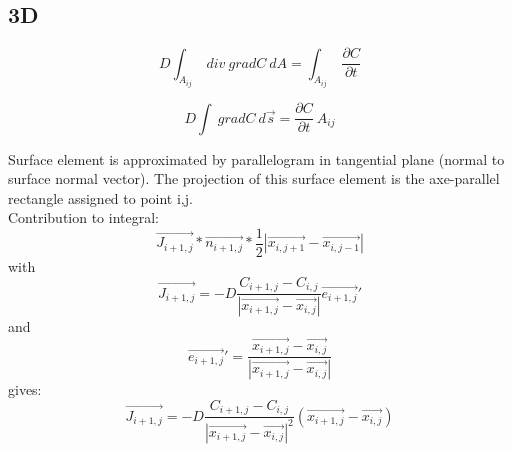 \subsection{3D}
\begin{equation}
D\int_{A_{ij}}~div~gradC~dA = \int_{A_{ij}}~\frac{\partial C}{\partial t}
\end{equation}

\begin{equation}
D\int~gradC~d\vec{s} = \frac{\partial C}{\partial t}~A_{ij}
\end{equation}

Surface element is approximated by parallelogram in tangential plane (normal to surface normal vector). The projection of this surface element is the axe-parallel rectangle assigned to point i,j.\\

Contribution to integral:\\
\begin{equation}
\vec{J_{i+1,j}}*\vec{n_{i+1,j}}*\frac{1}{2}|\vec{x_{i,j+1}}-\vec{x_{i,j-1}}|
\end{equation}
with
\begin{equation}
\vec{J_{i+1,j}} = -D\frac{C_{i+1,j}-C_{i,j}}{|\vec{x_{i+1,j}} - \vec{x_{i,j}}|}\vec{e_{i+1,j}}'
\end{equation}
and 
\begin{equation}
\vec{e_{i+1,j}}' = \frac{\vec{x_{i+1,j}} - \vec{x_{i,j}}}{|\vec{x_{i+1,j}} - \vec{x_{i,j}}|}
\end{equation}
gives:
\begin{equation}
\vec{J_{i+1,j}} = -D\frac{C_{i+1,j}-C_{i,j}}{|\vec{x_{i+1,j}} - \vec{x_{i,j}}|^2}(\vec{x_{i+1,j}} - \vec{x_{i,j}})
\end{equation}\\


